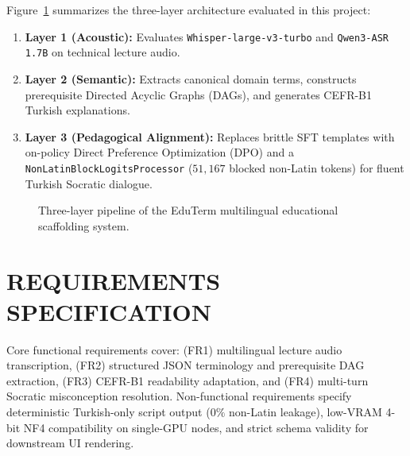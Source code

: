 \documentclass[a4paper,12pt]{report}
\begin{document}
Figure~\ref{fig:midterm_pipeline} summarizes the three-layer architecture evaluated in this project:
\begin{enumerate}
    \item \textbf{Layer 1 (Acoustic):} Evaluates \texttt{Whisper-large-v3-turbo} and \texttt{Qwen3-ASR 1.7B} on technical lecture audio.
    \item \textbf{Layer 2 (Semantic):} Extracts canonical domain terms, constructs prerequisite Directed Acyclic Graphs (DAGs), and generates CEFR-B1 Turkish explanations.
    \item \textbf{Layer 3 (Pedagogical Alignment):} Replaces brittle SFT templates with on-policy Direct Preference Optimization (DPO) and a \texttt{NonLatinBlockLogitsProcessor} ($51{,}167$ blocked non-Latin tokens) for fluent Turkish Socratic dialogue.
\end{enumerate}

\begin{figure}[htbp]
\centering
{}
\caption{Three-layer pipeline of the EduTerm multilingual educational scaffolding system.}
\label{fig:midterm_pipeline}
\end{figure}

\chapter{REQUIREMENTS SPECIFICATION}

Core functional requirements cover: (FR1) multilingual lecture audio transcription, (FR2) structured JSON terminology and prerequisite DAG extraction, (FR3) CEFR-B1 readability adaptation, and (FR4) multi-turn Socratic misconception resolution. Non-functional requirements specify deterministic Turkish-only script output ($0\%$ non-Latin leakage), low-VRAM 4-bit NF4 compatibility on single-GPU nodes, and strict schema validity for downstream UI rendering.
\end{document}
